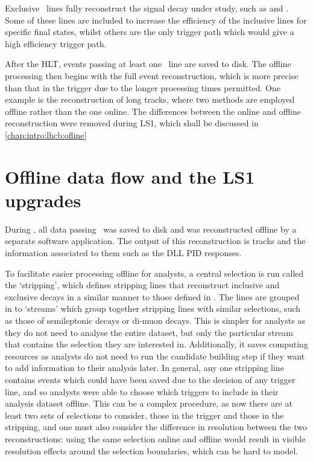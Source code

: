Exclusive \hlttwo\ lines fully reconstruct the signal decay under study, such 
as \decay{\PB}{\pimpip} and \decay{\PLambdac}{\Pproton\PKminus\Ppiplus}.
Some of these lines are included to increase the efficiency of the inclusive 
lines for specific final states, whilst others are the only trigger path which 
would give a high efficiency trigger path.

After the \acl{HLT}, events passing at least one \hlttwo\ line are saved to 
disk.
The offline processing then begins with the full event reconstruction, which is 
more precise than that in the trigger due to the longer processing times 
permitted.
One example is the reconstruction of long tracks, where two methods are 
employed offline rather than the one online.
The differences between the online and offline reconstruction were removed 
during \ac{LS1}, which shall be discussed in \cref{chap:intro:lhcb:ofline}

\section{Offline data flow and the \ac{LS1} upgrades}
\label{chap:intro:lhcb:offline}

During \runone, all data passing \hlttwo\ was saved to disk and was 
reconstructed offline by a separate software application.
The output of this reconstruction is tracks and the information associated to 
them such as the \ac{DLL} \ac{PID} responses.

To facilitate easier processing offline for analysts, a central selection is 
run called the `stripping', which defines stripping lines that reconstruct 
inclusive and exclusive decays in a similar manner to those defined in \hlttwo.
The lines are grouped in to `streams' which group together stripping lines with 
similar selections, such as those of semileptonic \PB decays or di-muon decays.
This is simpler for analysts as they do not need to analyse the entire dataset, 
but only the particular stream that contains the selection they are interested 
in.
Additionally, it saves computing resources as analysts do not need to run the 
candidate building step if they want to add information to their analysis 
later.
In general, any one stripping line contains events which could have been saved 
due to the decision of any trigger line, and so analysts were able to choose 
which triggers to include in their analysis dataset offline.
This can be a complex procedure, as now there are at least two sets of 
selections to consider, those in the trigger and those in the stripping, and 
one must also consider the difference in resolution between the two 
reconstructions: using the same selection online and offline would result in 
visible resolution effects around the selection boundaries, which can be hard 
to model.

